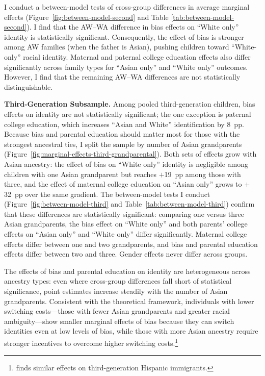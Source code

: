 I conduct a between-model tests of cross-group differences in average marginal effects (Figure~\ref{fig:between-model-second} and Table \ref{tab:between-model-second}). I find that the AW--WA difference in bias effects on ``White only'' identity is statistically significant. Consequently, the effect of bias is stronger among AW families (when the father is Asian), pushing children toward ``White-only'' racial identity. Maternal and paternal college education effects also differ significantly across family types for ``Asian only'' and ``White only'' outcomes. However, I find that the remaining AW--WA differences are not statistically distinguishable. 

\textbf{Third-Generation Subsample.} Among pooled third-generation children, bias effects on identity are not statistically significant; the one exception is paternal college education, which increases ``Asian and White'' identification by 8~pp. Because bias and parental education should matter most for those with the strongest ancestral ties, I split the sample by number of Asian grandparents (Figure~\ref{fig:marginal-effects-third-grandparental}). Both sets of effects grow with Asian ancestry: the effect of bias on ``White only'' identity is negligible among children with one Asian grandparent but reaches $+$19~pp among those with three, and the effect of maternal college education on ``Asian only'' grows to $+$32~pp over the same gradient. The between-model tests I conduct (Figure~\ref{fig:between-model-third} and Table~\ref{tab:between-model-third}) confirm that these differences are statistically significant: comparing one versus three Asian grandparents, the bias effect on ``White only'' and both parents' college effects on ``Asian only'' and ``White only'' differ significantly. Maternal college effects differ between one and two grandparents, and bias and parental education effects differ between two and three. Gender effects never differ across groups.

The effects of bias and parental education on identity are heterogeneous across ancestry types: even where cross-group differences fall short of statistical significance, point estimates increase steadily with the number of Asian grandparents. Consistent with the theoretical framework, individuals with lower switching costs---those with fewer Asian grandparents and greater racial ambiguity---show smaller marginal effects of bias because they can switch identities even at low levels of bias, while those with more Asian ancestry require stronger incentives to overcome higher switching costs.\footnote{\textcite{hadah2024hispanicidentity} finds similar effects on third-generation Hispanic immigrants.}

